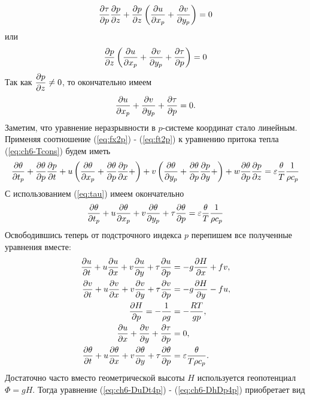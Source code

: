    \begin{equation*}
       \pd{\tau}{p}\pd{p}{z} + \pd{p}{z} \left( \pd{u}{x_p} + \pd{v}{y_p} \right) = 0
   \end{equation*}
   или
   \begin{equation*}
       \pd{p}{z} \left( \pd{u}{x_p} + \pd{v}{y_p} + \pd{\tau}{p}  \right) = 0
   \end{equation*}
   Так как $\pd{p}{z}\neq0$, то окончательно имеем
   \begin{equation}
       \pd{u}{x_p} + \pd{v}{y_p} + \pd{\tau}{p} = 0.
   \end{equation}
   Заметим, что уравнение неразрывности в $p$-системе координат стало линейным. Применяя соотношение (\ref{eq:fx2p}) - (\ref{eq:ft2p}) к уравнению притока тепла (\ref{eq:ch6-Tcons}) будем иметь
   \begin{multline*}
        \pd{\theta}{t_p} + 
        \pd{\theta}{p}\pd{p}{t}+u \left( \pd{\theta}{x_p} + \pd{\theta}{p}\pd{p}{x} + \right) + 
        v \left( \pd{\theta}{y_p} + \pd{\theta}{p}\pd{p}{y} + \right) + 
        w \pd{\theta}{p}\pd{p}{z} = \varepsilon\frac{\theta}{T}\frac{1}{\rho c_p}
   \end{multline*}
   С использованием (\ref{eq:tau}) имеем окончательно 
   \begin{equation}
       \label{eq:cp6-Tcons4p}
       \pd{\theta}{t_p} + u\pd{\theta}{x_p} + v\pd{\theta}{y_p} + \tau \pd{\theta}{p} = \varepsilon\frac{\theta}{T}\frac{1}{\rho c_p}
   \end{equation}
   Освободившись теперь от подстрочного индекса $p$ перепишем все полученные уравнения вместе:
   \begin{align}
        \pd{u}{t}+u\pd{u}{x}+v\pd{u}{y}+\tau\pd{u}{p} &= - g \pd{H}{x}+fv, \label{eq:ch6-DuDt4p} \\
        \pd{v}{t}+u\pd{v}{x}+v\pd{v}{y}+\tau\pd{v}{p} &= - g \pd{H}{y}-fu, \\
        \pd{H}{p}=-\frac{1}{\rho g}&=-\frac{RT}{gp}, \label{eq:ch6-DhDp4p}\\
        \pd{u}{x} + \pd{v}{y} + \pd{\tau}{p} &= 0, \label{eq:ch6-masscons4p}\\
        \pd{\theta}{t} + u\pd{\theta}{x} + v\pd{\theta}{y} + \tau \pd{\theta}{p} &= \varepsilon\frac{\theta}{T \rho c_p}. \label{eq:ch6-DthetaDt4p}
   \end{align}
   Достаточно часто вместо геометрической высоты $H$ используется геопотенциал $\Phi=gH$. Тогда уравнение (\ref{eq:ch6-DuDt4p}) - (\ref{eq:ch6-DhDp4p}) приобретает вид
